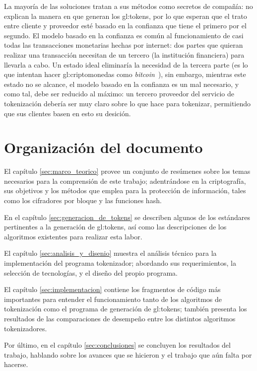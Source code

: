 La mayoría de las soluciones tratan a sus métodos como secretos de compañía: no
explican la manera en que generan los \glspl{gl:token}, por lo que esperan que
el trato entre cliente y proveedor esté basado en la confianza que tiene el
primero por el segundo. El modelo basado en la confianza es común al
funcionamiento de casi todas las transacciones monetarias hechas por internet:
dos partes que quieran realizar una transacción necesitan de un tercero (la
institución financiera) para llevarla a cabo. Un estado ideal eliminaría la
necesidad de la tercera parte (es lo que intentan hacer
\glspl{gl:criptomoneda} como \textit{bitcoin}~\cite{bitcoin}), sin embargo,
mientras este estado no se alcance, el modelo basado en la confianza es un mal
necesario, y como tal, debe ser reducido al máximo: un tercero proveedor del
servicio de tokenización debería ser muy claro sobre lo que hace para
tokenizar, permitiendo que sus clientes basen en esto su desición.


\section{Organización del documento}

El capítulo \ref{sec:marco_teorico} provee un conjunto de resúmenes sobre los
temas necesarios para la comprensión de este trabajo; adentrándose en la
criptografía, sus objetivos y los métodos que emplea para la protección de
información, tales como los cifradores por bloque y las funciones hash.

En el capítulo \ref{sec:generacion_de_tokens} se describen algunos de los
estándares pertinentes a la generación de \glspl{gl:token}, así como las
descripciones de los algoritmos existentes para realizar esta labor.

El capítulo \ref{sec:analisis_y_disenio} muestra el análisis técnico para
la implementación del programa tokenizador; abordando sus requerimientos,
la selección de tecnologías, y el diseño del propio programa.

El capítulo \ref{sec:implementacion} contiene los fragmentos de código más
importantes para entender el funcionamiento tanto de los algoritmos de
tokenización como el programa de generación de \glspl{gl:token}; también
presenta los resultados de las comparaciones de desempeño entre los
distintos algoritmos tokenizadores.

Por último, en el capítulo \ref{sec:conclusiones} se concluyen los resultados
del trabajo, hablando sobre los avances que se hicieron y el trabajo que aún
falta por hacerse.
